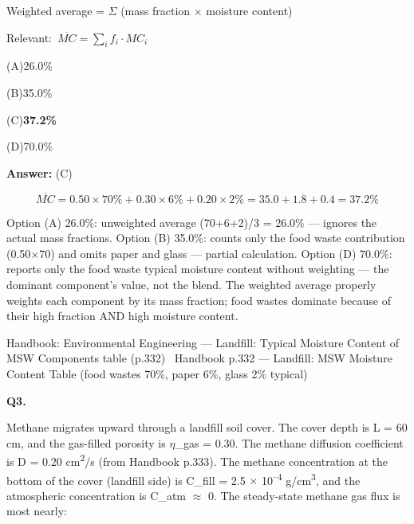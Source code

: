 \documentclass[11pt]{article}
\newcommand{\correct}[1]{\textbf{#1}\;{\color{accent}$\checkmark$}}
\newcommand{\optline}[2]{\par\noindent\hspace{1.2em}(#1)\hspace{0.6em}#2}
\begin{document}
Weighted average = $\Sigma$ (mass fraction $\times$ moisture content)\par\vspace{3pt}
{\small\color{soft}Relevant:}\ $\overline{MC} = \sum_i f_i \cdot MC_i$\par\vspace{3pt}
\optline{A}{26.0\%}
\optline{B}{35.0\%}
\optline{C}{\correct{37.2\%}}
\optline{D}{70.0\%}
\par\vspace{3pt}
\vspace{2pt}\par\noindent\colorbox{boxbg}{\parbox{\dimexpr\linewidth-2\fboxsep\relax}{%
\vspace{2pt}\textbf{Answer:} (C)\par\vspace{2pt}
{\small \[\overline{MC} = 0.50 \times 70\% + 0.30 \times 6\% + 0.20 \times 2\% = 35.0 + 1.8 + 0.4 = 37.2\%\]

Option (A) 26.0\%: unweighted average (70+6+2)/3 = 26.0\% --- ignores the actual mass fractions. Option (B) 35.0\%: counts only the food waste contribution (0.50$\times$70) and omits paper and glass --- partial calculation. Option (D) 70.0\%: reports only the food waste typical moisture content without weighting --- the dominant component's value, not the blend. The weighted average properly weights each component by its mass fraction; food wastes dominate because of their high fraction AND high moisture content.}\par\vspace{2pt}
{\footnotesize\color{soft}Handbook: Environmental Engineering --- Landfill: Typical Moisture Content of MSW Components table (p.332) \textbullet\ Handbook p.332 --- Landfill: MSW Moisture Content Table (food wastes 70\%, paper 6\%, glass 2\% typical)}\vspace{2pt}
}}
\vspace{9pt}
\filbreak
\textbf{\color{accent}Q3.}\par\vspace{2pt}
Methane migrates upward through a landfill soil cover. The cover depth is L = 60 cm, and the gas-filled porosity is $\eta$\_gas = 0.30. The methane diffusion coefficient is D = 0.20 cm\textsuperscript{2}/s (from Handbook p.333). The methane concentration at the bottom of the cover (landfill side) is C\_fill = 2.5 $\times$ 10\textsuperscript{--}\textsuperscript{4} g/cm\textsuperscript{3}, and the atmospheric concentration is C\_atm $\approx$ 0. The steady-state methane gas flux is most nearly:
\end{document}
